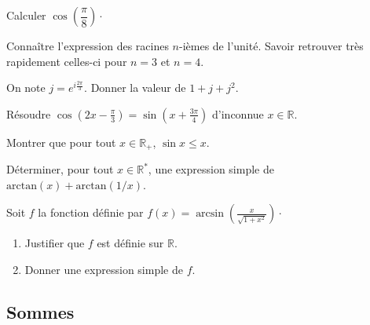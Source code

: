\documentclass[a4paper,twoside,french,11pt]{VcCours}
\begin{document}
\begin{Exercice}{}
  Calculer $\cos \left(\dfrac{\pi}{8}\right) \cdot$
\end{Exercice} 

\begin{ptc}{}
	Connaître l'expression des racines $n$-ièmes de l'unité. Savoir retrouver très rapidement celles-ci pour $n=3$ et $n=4$.
\end{ptc}

\begin{Exercice}{}
  On note $j=e^{i\tfrac{2\pi}{3}}$. Donner la valeur de $1+j+j^2$.
\end{Exercice} 

\begin{Exercice}{}
  Résoudre $\cos(2x - \tfrac{\pi}{3}) = \sin(x + \tfrac{3\pi}{4})$ d'inconnue $x \in \mathbb{R}$.
\end{Exercice} 

\begin{Exercice}{}
  Montrer que pour tout $x \in \mathbb{R}_+$, $\sin x \leq x$.
\end{Exercice} 


\begin{Exercice}{}
  Déterminer, pour tout $x \in \mathbb{R}^*$, une expression simple de $\textrm{arctan}(x)+ \textrm{arctan}(1/x)$.
\end{Exercice} 

\begin{Exercice}{}
  Soit $f$ la fonction définie par $f(x) =  \arcsin \left( \frac{x}{\sqrt {1 + x^{2}}} \right) \cdot$

  \begin{enumerate}
    \item Justifier que $f$ est définie sur $\mathbb{R}$.
    \item Donner une expression simple de $f$.
  \end{enumerate}
\end{Exercice} 

\subsection{Sommes}
\end{document}
